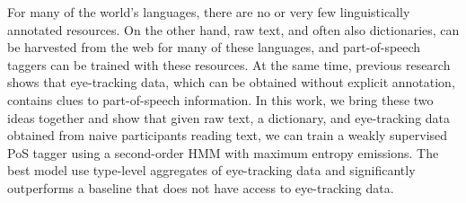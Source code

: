 For many of the world's languages, there are no or very few linguistically annotated resources. On the other hand, raw text, and often also dictionaries, can be harvested from the web for many of these languages, and part-of-speech taggers can be trained with these resources. At the same time, previous research shows that eye-tracking data, which can be obtained without explicit annotation, contains clues to part-of-speech information. In this work, we bring these two ideas together and show that given raw text, a dictionary, and eye-tracking data obtained from naive participants reading text, we can train a weakly supervised PoS tagger using a second-order HMM with maximum entropy emissions. The best model use type-level aggregates of eye-tracking data and significantly outperforms a baseline that does not have access to eye-tracking data.
